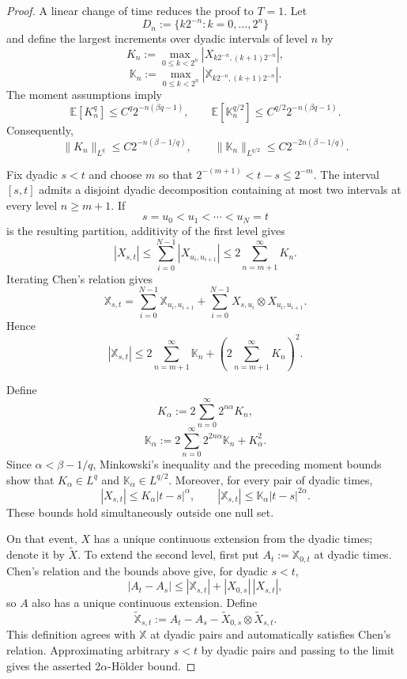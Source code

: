 \begin{proof}
A linear change of time reduces the proof to $T=1$.  Let
\[
  D_n:=\{k2^{-n}:k=0,\ldots,2^n\}
\]
and define the largest increments over dyadic intervals of level $n$ by
\[
  K_n:=\max_{0\le k<2^n}|X_{k2^{-n},(k+1)2^{-n}}|,
\]
\[
  \mathbb K_n:=\max_{0\le k<2^n}
  |\mathbb X_{k2^{-n},(k+1)2^{-n}}|.
\]
The moment assumptions imply
\[
  \mathbb E[K_n^q]\le C^q2^{-n(\beta q-1)},
  \qquad
  \mathbb E[\mathbb K_n^{q/2}]
       \le C^{q/2}2^{-n(\beta q-1)}.
\]
Consequently,
\[
  \|K_n\|_{L^q}\le C2^{-n(\beta-1/q)},
  \qquad
  \|\mathbb K_n\|_{L^{q/2}}
       \le C2^{-2n(\beta-1/q)}.
\]

Fix dyadic $s<t$ and choose $m$ so that
$2^{-(m+1)}<t-s\le2^{-m}$.  The interval $[s,t]$ admits a disjoint dyadic
decomposition containing at most two intervals at every level
$n\ge m+1$.  If
\[
  s=u_0<u_1<\cdots<u_N=t
\]
is the resulting partition, additivity of the first level gives
\[
  |X_{s,t}|
  \le\sum_{i=0}^{N-1}|X_{u_i,u_{i+1}}|
  \le2\sum_{n=m+1}^\infty K_n.
\]
Iterating Chen's relation gives
\[
  \mathbb X_{s,t}
  =\sum_{i=0}^{N-1}\mathbb X_{u_i,u_{i+1}}
   +\sum_{i=0}^{N-1}X_{s,u_i}\otimes X_{u_i,u_{i+1}}.
\]
Hence
\[
  |\mathbb X_{s,t}|
  \le2\sum_{n=m+1}^\infty\mathbb K_n
     +\left(2\sum_{n=m+1}^\infty K_n\right)^2.
\]

Define
\[
  K_\alpha:=2\sum_{n=0}^\infty2^{n\alpha}K_n,
\]
\[
  \mathbb K_\alpha
  :=2\sum_{n=0}^\infty2^{2n\alpha}\mathbb K_n+K_\alpha^2.
\]
Since $\alpha<\beta-1/q$, Minkowski's inequality and the preceding moment
bounds show that $K_\alpha\in L^q$ and
$\mathbb K_\alpha\in L^{q/2}$.  Moreover, for every pair of dyadic times,
\[
  |X_{s,t}|\le K_\alpha|t-s|^\alpha,
  \qquad
  |\mathbb X_{s,t}|\le\mathbb K_\alpha|t-s|^{2\alpha}.
\]
These bounds hold simultaneously outside one null set.

On that event, $X$ has a unique continuous extension from the dyadic times;
denote it by $\widetilde X$.  To extend the second level, first put
$A_t:=\mathbb X_{0,t}$ at dyadic times.  Chen's relation and the bounds above
give, for dyadic $s<t$,
\[
  |A_t-A_s|
  \le |\mathbb X_{s,t}|+|X_{0,s}|\,|X_{s,t}|,
\]
so $A$ also has a unique continuous extension.  Define
\[
  \widetilde{\mathbb X}_{s,t}
  :=A_t-A_s-\widetilde X_{0,s}\otimes\widetilde X_{s,t}.
\]
This definition agrees with $\mathbb X$ at dyadic pairs and automatically
satisfies Chen's relation.  Approximating arbitrary $s<t$ by dyadic pairs and
passing to the limit gives the asserted $2\alpha$-Hölder bound.


\end{proof}
